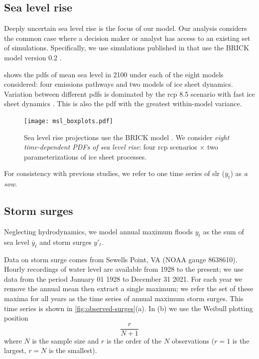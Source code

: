 \documentclass[12pt]{article}
\newcommand{\james}[1]{\todo[color=giallo, textcolor=nero]{\textbf{ATTN James:~}#1}} %
\begin{document}
\subsection{Sea level rise}\label{sec:sea-level}

Deeply uncertain sea level rise is the focus of our model.
Our analysis considers the common case where a decision maker or analyst has access to an existing set of simulations.
Specifically, we use simulations published in \citet{ruckart_hazardous:2008} that use the BRICK model version 0.2 \citep{wong_brick0.2:2017}.

 shows the \glspl{pdf} of mean sea level in 2100 under each of the eight models considered: four emissions pathways \citep[\gls{rcp} scenarios][]{moss_rcp:2010} and two models of ice sheet dynamics.
Variation between different \glspl{pdf} is dominated by the \gls{rcp} 8.5 scenario with fast ice sheet dynamics \citep[see][for a discussion of these dynamics]{wong_brick0.2:2017}.
This is also the \gls{pdf} with the greatest within-model variance.
\begin{figure}
    \centering
    \texttt{[image: msl\_boxplots.pdf]}
    \caption{
        Sea level rise projections use the BRICK model \citep{wong_brick0.2:2017,ruckert_coastal:2019}.
        We consider \emph{eight time-dependent PDFs of sea level rise}: four \gls{rcp} scenarios $\times$ two parameterizations of ice sheet processes.
    }\label{fig:msl-boxplots}
\end{figure}

For consistency with previous studies, we refer to one time series of \gls{slr} ($\overline{y}_t$) as \emph{a \acrfull{sow}}.

\subsection{Storm surges}\label{sec:storm-surge}

Neglecting hydrodynamics, we model annual maximum floods $y_t$ as the sum of sea level $\overline{y}_t$ and storm surges $y'_t$.

Data on storm surge comes from Sewells Point, VA (NOAA gauge 8638610).\james{cite NOAA data source}
Hourly recordings of water level are available from 1928 to the present; we use data from the period January 01 1928 to December 31 2021.
For each year we remove the annual mean then extract a single maximum; we refer the set of these maxima for all years as the time series of annual maximum storm surges.
This time series is shown in \cref{fig:observed-surges}(a).
In (b) we use the Weibull plotting position
\begin{equation}\label{eq:plot-pos}
    \frac{r}{N + 1}
\end{equation}
where $N$ is the sample size and $r$ is the order of the $N$ observations ($r=1$ is the largest, $r=N$ is the smallest).
\end{document}
